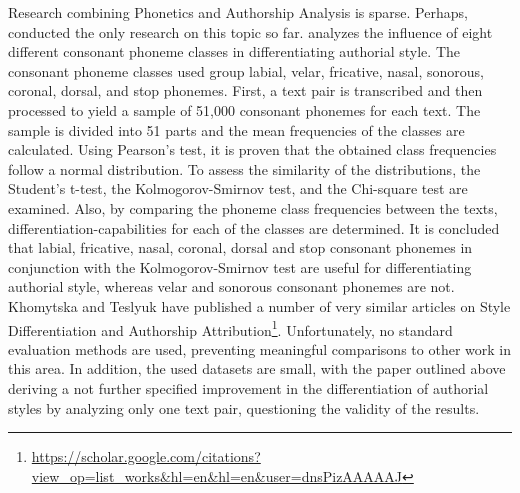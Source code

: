 Research combining Phonetics and Authorship Analysis is sparse.
Perhaps, \citeauthor{khomytska2019nonparametric} conducted the only research on this topic so far.
\cite{khomytska2019nonparametric} analyzes the influence of eight different consonant phoneme classes in differentiating authorial style.
The consonant phoneme classes used group labial, velar, fricative, nasal, sonorous, coronal, dorsal, and stop phonemes.
First, a text pair is transcribed and then processed to yield a sample of 51,000 consonant phonemes for each text.
The sample is divided into 51 parts and the mean frequencies of the classes are calculated.
Using Pearson's test, it is proven that the obtained class frequencies follow a normal distribution.
To assess the similarity of the distributions, the Student's t-test, the Kolmogorov-Smirnov test, and the Chi-square test are examined.
Also, by comparing the phoneme class frequencies between the texts, differentiation-capabilities for each of the classes are determined.
It is concluded that labial, fricative, nasal, coronal, dorsal and  stop consonant phonemes in conjunction with the Kolmogorov-Smirnov test are useful for differentiating authorial style, whereas velar and sonorous consonant phonemes are not.
Khomytska and Teslyuk have published a number of very similar articles on Style Differentiation and Authorship Attribution\footnote{\url{https://scholar.google.com/citations?view_op=list_works&hl=en&hl=en&user=dnsPizAAAAAJ}}.
Unfortunately, no standard evaluation methods are used, preventing meaningful comparisons to other work in this area.
In addition, the used datasets are small, with the paper outlined above deriving a not further specified improvement in the differentiation of authorial styles by analyzing only one text pair, questioning the validity of the results.\\

